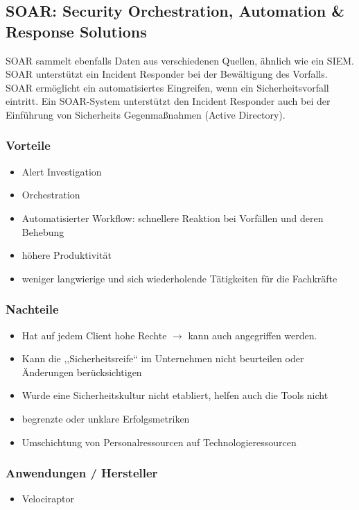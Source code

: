 \subsection{SOAR: Security Orchestration, Automation \& Response Solutions}\label{subsec:soar}
SOAR sammelt ebenfalls Daten aus verschiedenen Quellen, ähnlich wie ein SIEM.
SOAR unterstützt ein Incident Responder bei der Bewältigung des Vorfalls. SOAR ermöglicht ein automatisiertes Eingreifen, wenn ein Sicherheitsvorfall eintritt. Ein SOAR-System unterstützt den Incident Responder auch bei der Einführung von Sicherheits Gegenmaßnahmen (Active Directory).\\

\subsubsection{Vorteile}
\begin{itemize}
    \item Alert Investigation
    \item Orchestration
    \item Automatisierter Workflow: schnellere Reaktion bei Vorfällen und deren Behebung
    \item höhere Produktivität
    \item weniger langwierige und sich wiederholende Tätigkeiten für die Fachkräfte
\end{itemize}

\subsubsection{Nachteile}
\begin{itemize}
    \item Hat auf jedem Client hohe Rechte $\rightarrow$ kann auch angegriffen werden.
    \item Kann die ,,Sicherheitsreife`` im Unternehmen nicht beurteilen oder Änderungen berücksichtigen
    \item Wurde eine Sicherheitskultur nicht etabliert, helfen auch die Tools nicht
    \item begrenzte oder unklare Erfolgsmetriken
    \item Umschichtung von Personalressourcen auf Technologieressourcen
\end{itemize}

\subsubsection{Anwendungen / Hersteller}
\begin{itemize}
    \item Velociraptor
\end{itemize}


